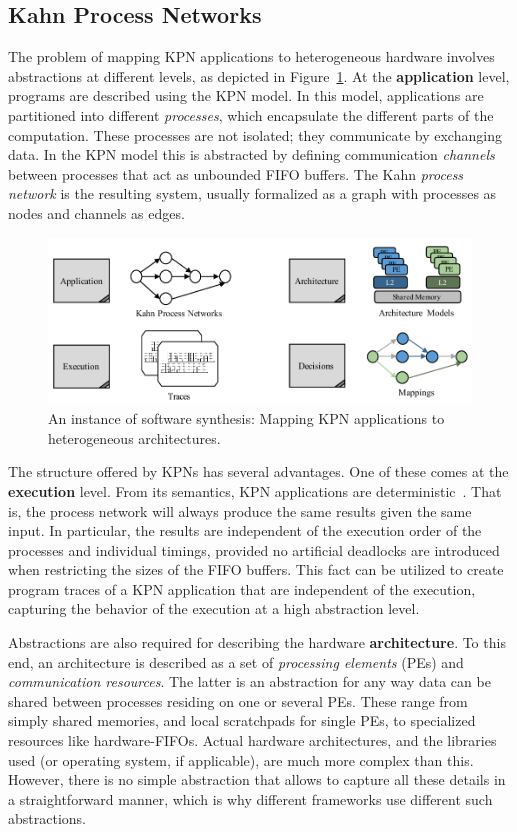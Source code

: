 \documentclass{article}
\begin{document}
\subsection{Kahn Process Networks}

The problem of mapping KPN applications to heterogeneous hardware involves abstractions at different levels, as depicted in Figure~\ref{fig:problem}.
At the \textbf{application} level, programs are described using the KPN model. In this model, applications are partitioned into
different \emph{processes}, which encapsulate the different parts of the computation. These processes are not isolated;
they communicate by exchanging data. In the KPN model this is abstracted by defining communication \emph{channels}
between processes that act as unbounded FIFO buffers. The Kahn \emph{process network} is the resulting system, usually formalized as a graph 
with processes as nodes and channels as edges.

 \begin{figure}
 	\centering
 	\includegraphics[width=.48\textwidth]{figures/problem.pdf} 
 	\caption{An instance of software synthesis: Mapping KPN applications to heterogeneous architectures.}
 	\label{fig:problem}
 		\vspace{-3mm}
 \end{figure}

The structure offered by KPNs has several advantages. One of these comes at the \textbf{execution} level. 
From its semantics, KPN applications are deterministic~\cite{kahn74}. 
That is, the process network will always produce the same results given the same input.
In particular, the results are independent of the execution order of the processes and individual timings,
provided no artificial deadlocks are introduced when restricting the sizes of the FIFO buffers.
This fact can be utilized to create program traces of a KPN application that are independent of the execution,
capturing the behavior of the execution at a high abstraction level.

Abstractions are also required for describing the hardware \textbf{architecture}.
To this end, an architecture is described as a set of \emph{processing elements} (PEs) and \emph{communication resources}.
The latter is an abstraction for any way data can be shared between processes residing on one or several PEs. 
These range from simply shared memories, and local scratchpads for single PEs, to specialized resources like hardware-FIFOs.
Actual hardware architectures, and the libraries used (or operating system, if applicable), are much more complex than this.
However, there is no simple abstraction that allows to capture all these details in a straightforward manner, 
which is why different frameworks use different such abstractions.
\end{document}
